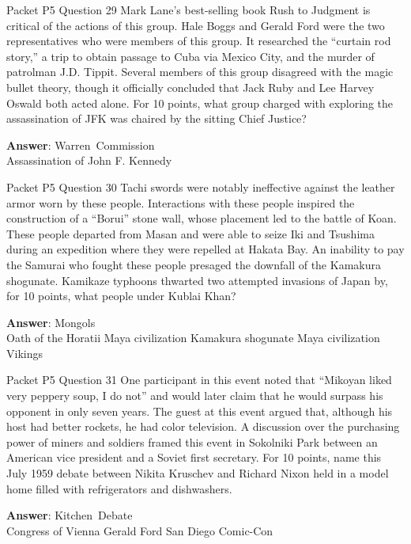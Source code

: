 \begin{frame}{Packet P5 Question 29}
Mark Lane’s best-selling book Rush to Judgment is critical of the actions of this group. Hale Boggs and     Gerald Ford were the   two representatives who were members of this group. It researched the ``curtain rod story,'' a trip to obtain passage to Cuba via Mexico City, and the murder of patrolman J.D. Tippit. Several members   of this group disagreed with the magic bullet theory, though it officially concluded that Jack Ruby and Lee Harvey Oswald both acted alone.   For 10 points, what group charged with exploring the assassination of JFK was chaired by the sitting Chief Justice?

\textbf{Answer}: Warren\ Commission\\
 Assassination of John F. Kennedy
\end{frame}

\begin{frame}{Packet P5 Question 30}
Tachi swords were notably   ineffective against the leather armor worn by these people. Interactions with these people inspired the construction of a ``Borui'' stone wall, whose placement led to the battle of Koan. These people departed from Masan and were able to seize Iki and Tsushima during an expedition where they were repelled at Hakata Bay. An inability to pay   the Samurai who fought these people presaged the downfall of the Kamakura shogunate.   Kamikaze typhoons thwarted two attempted invasions of Japan by, for 10 points, what people under Kublai Khan?      

\textbf{Answer}: Mongols\\
 Oath of the Horatii
 Maya civilization
 Kamakura shogunate
 Maya civilization
 Vikings
\end{frame}

\begin{frame}{Packet P5 Question 31}
One participant in this event noted that “Mikoyan liked very peppery soup, I do not” and would later claim that he would surpass his opponent in only seven years. The guest at this event argued that, although his host had better rockets, he had color television. A discussion over the purchasing power of miners and soldiers framed this event in Sokolniki Park between an American vice president and a Soviet first secretary. For 10 points, name this July 1959 debate between Nikita Kruschev and Richard Nixon held in a model   home filled with refrigerators and dishwashers.      

\textbf{Answer}: Kitchen\ Debate\\
 Congress of Vienna
 Gerald Ford
 San Diego Comic-Con
\end{frame}

